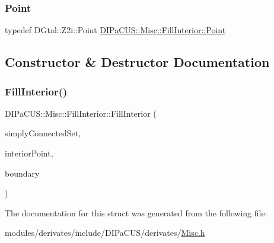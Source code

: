 \subsubsection{\texorpdfstring{Point}{Point}}
{\footnotesize\ttfamily typedef D\+Gtal\+::\+Z2i\+::\+Point \mbox{\hyperlink{structDIPaCUS_1_1Misc_1_1FillInterior_a88bed595883eb022eb4e9f093ee00d18}{D\+I\+Pa\+C\+U\+S\+::\+Misc\+::\+Fill\+Interior\+::\+Point}}}



\subsection{Constructor \& Destructor Documentation}
\mbox{\label{structDIPaCUS_1_1Misc_1_1FillInterior_a05ba475a43a025a4d06577b3ad20e298}} 
\subsubsection{\texorpdfstring{Fill\+Interior()}{FillInterior()}}
{\footnotesize\ttfamily D\+I\+Pa\+C\+U\+S\+::\+Misc\+::\+Fill\+Interior\+::\+Fill\+Interior (\begin{DoxyParamCaption}\item[{\mbox{\hyperlink{structDIPaCUS_1_1Misc_1_1FillInterior_a6fb325418d6c5f5e07619176576708aa}{Digital\+Set}} \&}]{simply\+Connected\+Set,  }\item[{const \mbox{\hyperlink{structDIPaCUS_1_1Misc_1_1FillInterior_a88bed595883eb022eb4e9f093ee00d18}{Point}} \&}]{interior\+Point,  }\item[{const \mbox{\hyperlink{structDIPaCUS_1_1Misc_1_1FillInterior_a6fb325418d6c5f5e07619176576708aa}{Digital\+Set}} \&}]{boundary }\end{DoxyParamCaption})}



The documentation for this struct was generated from the following file\+:\begin{DoxyCompactItemize}
\item 
modules/derivates/include/\+D\+I\+Pa\+C\+U\+S/derivates/\mbox{\hyperlink{Misc_8h}{Misc.\+h}}\end{DoxyCompactItemize}
